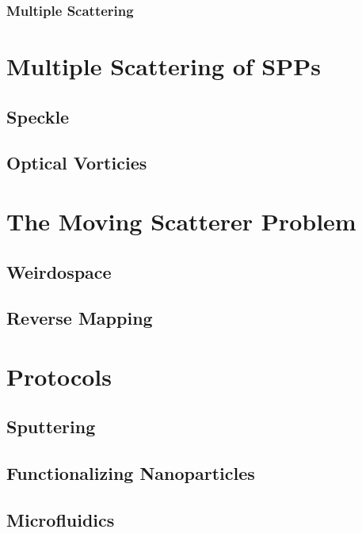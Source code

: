 \documentclass[a4paper,titlepage,onecolumn]{report}
\begin{document}
\subsection{Multiple Scattering}
 

\chapter{Multiple Scattering of SPPs}
\section{Speckle}
\section{Optical Vorticies}

\chapter{The Moving Scatterer Problem}
\section{Weirdospace}
\section{Reverse Mapping}






\appendix
\chapter{Protocols}
\section{Sputtering}
\section{Functionalizing Nanoparticles}
\section{Microfluidics}
\end{document}
